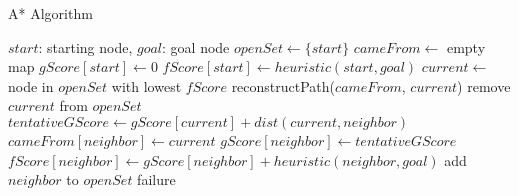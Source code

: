 \begin{algorithm}
\caption{A* Algorithm}
\label{alg:a_star}
\begin{algorithmic}[1]
\REQUIRE $start$: starting node, $goal$: goal node
\STATE $openSet \gets \{start\}$
\STATE $cameFrom \gets$ empty map
\STATE $gScore[start] \gets 0$
\STATE $fScore[start] \gets heuristic(start, goal)$
  \STATE $current \gets$ node in $openSet$ with lowest $fScore$
    \RETURN reconstructPath($cameFrom$, $current$)
  \ENDIF
  \STATE remove $current$ from $openSet$
    \STATE $tentativeGScore \gets gScore[current] + dist(current, neighbor)$
      \STATE $cameFrom[neighbor] \gets current$
      \STATE $gScore[neighbor] \gets tentativeGScore$
      \STATE $fScore[neighbor] \gets gScore[neighbor] + heuristic(neighbor, goal)$
        \STATE add $neighbor$ to $openSet$
      \ENDIF
    \ENDIF
  \ENDFOR
\ENDWHILE
\RETURN failure
\end{algorithmic}
\end{algorithm}
